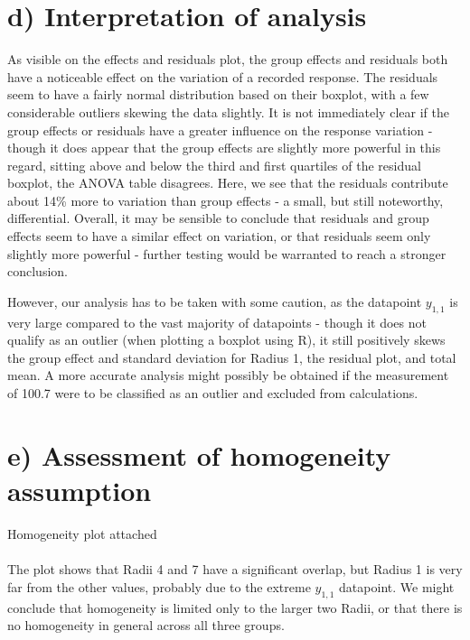 \documentclass[]{article}
\begin{document}
\section{d) Interpretation of analysis}
As visible on the effects and residuals plot, the group effects and residuals both have a noticeable effect on the variation of a recorded response. The residuals seem to have a fairly normal distribution based on their boxplot, with a few considerable outliers skewing the data slightly. It is not immediately clear if the group effects or residuals have a greater influence on the response variation - though it does appear that the group effects are slightly more powerful in this regard, sitting above and below the third and first quartiles of the residual boxplot, the ANOVA table disagrees. Here, we see that the residuals contribute about 14\% more to variation than group effects - a small, but still noteworthy, differential. Overall, it may be sensible to conclude that residuals and group effects seem to have a similar effect on variation, or that residuals seem only slightly more powerful - further testing would be warranted to reach a stronger conclusion.

However, our analysis has to be taken with some caution, as the datapoint $y_{1,1}$ is very large compared to the vast majority of datapoints - though it does not qualify as an outlier (when plotting a boxplot using R), it still positively skews the group effect and standard deviation for Radius 1, the residual plot, and total mean. A more accurate analysis might possibly be obtained if the measurement of 100.7 were to be classified as an outlier and excluded from calculations.

\section{e) Assessment of homogeneity assumption}
Homogeneity plot attached\\
\\
The plot shows that Radii 4 and 7 have a significant overlap, but Radius 1 is very far from the other values, probably due to the extreme $y_{1,1}$ datapoint. We might conclude that homogeneity is limited only to the larger two Radii, or that there is no homogeneity in general across all three groups.
\end{document}
